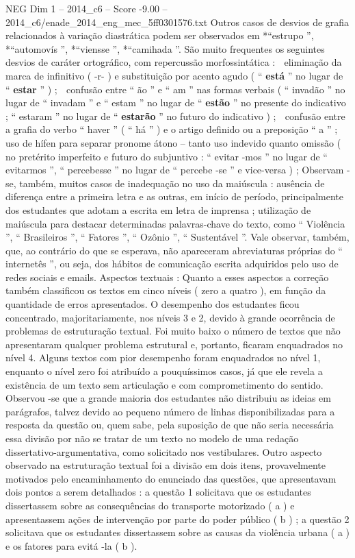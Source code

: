 \begin{textsample}{NEG Dim 1 – 2014\_c6 – Score -9.00 – 2014\_c6/enade\_2014\_eng\_mec\_5ff0301576.txt}
Outros casos de desvios de grafia relacionados à variação diastrática podem ser observados em *“estrupo ”, *“automovís ”, *“viensse ”, *“camihada ”.
São muito frequentes os seguintes desvios de caráter ortográfico, com repercussão morfossintática :  eliminação da marca de infinitivo ( -r- ) e substituição por acento agudo ( “ \textbf{está} ” no lugar de “ \textbf{estar} ” ) ;  confusão entre “ ão ” e “ am ” nas formas verbais ( “ invadão ” no lugar de “ invadam ” e “ estam ” no lugar de “ \textbf{estão} ” no presente do indicativo ; “ estaram ” no lugar de “ \textbf{estarão} ” no futuro do indicativo ) ;  confusão entre a grafia do verbo “ haver ” ( “ há ” ) e o artigo definido ou a preposição “ a ” ;  uso de hífen para separar pronome átono – tanto uso indevido quanto omissão ( no pretérito imperfeito e futuro do subjuntivo : “ evitar -mos ” no lugar de “ evitarmos ”, “ percebesse ” no lugar de “ percebe -se ” e vice-versa ) ; Observam -se, também, muitos casos de inadequação no uso da maiúscula : ausência de diferença entre a primeira letra e as outras, em início de período, principalmente dos estudantes que adotam a escrita em letra de imprensa ; utilização de maiúscula para destacar determinadas palavras-chave do texto, como “ Violência ”, “ Brasileiros ”, “ Fatores ”, “ Ozônio ”, “ Sustentável ”.
Vale observar, também, que, ao contrário do que se esperava, não apareceram abreviaturas próprias do “ internetês ”, ou seja, dos hábitos de comunicação escrita adquiridos pelo uso de redes sociais e emails.
Aspectos textuais : Quanto a esses aspectos a correção também classificou os textos em cinco níveis ( zero a quatro ), em função da quantidade de erros apresentados.
O desempenho dos estudantes ficou concentrado, majoritariamente, nos níveis 3 e 2, devido à grande ocorrência de problemas de estruturação textual.
Foi muito baixo o número de textos que não apresentaram qualquer problema estrutural e, portanto, ficaram enquadrados no nível 4.
Alguns textos com pior desempenho foram enquadrados no nível 1, enquanto o nível zero foi atribuído a pouquíssimos casos, já que ele revela a existência de um texto sem articulação e com comprometimento do sentido.
Observou -se que a grande maioria dos estudantes não distribuiu as ideias em parágrafos, talvez devido ao pequeno número de linhas disponibilizadas para a resposta da questão ou, quem sabe, pela suposição de que não seria necessária essa divisão por não se tratar de um texto no modelo de uma redação dissertativo-argumentativa, como solicitado nos vestibulares.
Outro aspecto observado na estruturação textual foi a divisão em dois itens, provavelmente motivados pelo encaminhamento do enunciado das questões, que apresentavam dois pontos a serem detalhados : a questão 1 solicitava que os estudantes dissertassem sobre as consequências do transporte motorizado ( a ) e apresentassem ações de intervenção por parte do poder público ( b ) ; a questão 2 solicitava que os estudantes dissertassem sobre as causas da violência urbana ( a ) e os fatores para evitá -la ( b ).

\end{textsample}
